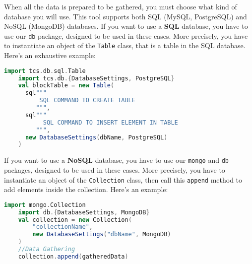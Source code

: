 When all the data is prepared to be gathered, you must choose what kind of database you will use. This tool supports both SQL (MySQL, PostgreSQL) and NoSQL (MongoDB) databases.
If you want to use a \textbf{SQL} database, you have to use our \texttt{db} package, designed to be used in these cases. More precisely, you have to instantiate an object of the \texttt{Table} class, that is a table in the SQL database. 
\newline
Here's an exhaustive example:
\begin{lstlisting}[language=Scala]
    import tcs.db.sql.Table
    import tcs.db.{DatabaseSettings, PostgreSQL}
    val blockTable = new Table(
      sql"""
          SQL COMMAND TO CREATE TABLE
         """,
      sql"""
           SQL COMMAND TO INSERT ELEMENT IN TABLE
         """,
      new DatabaseSettings(dbName, PostgreSQL)
    )
\end{lstlisting}
If you want to use a \textbf{NoSQL} database, you have to use our \texttt{mongo} and \texttt{db} packages, designed to be used in these cases. More precisely, you have to instantiate an object of the \texttt{Collection} class, then call this \texttt{append} method to add elements inside the collection. 
\newline
Here's an example:
\begin{lstlisting}[language=Scala]
    import mongo.Collection
    import db.{DatabaseSettings, MongoDB}
    val collection = new Collection(
        "collectionName", 
        new DatabaseSettings("dbName", MongoDB)
    )
    //Data Gathering
    collection.append(gatheredData)
\end{lstlisting}